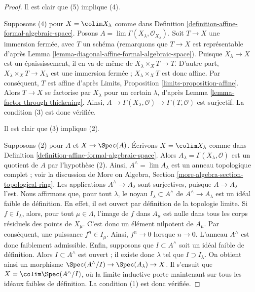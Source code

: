 \begin{proof}
Il est clair que (5) implique (4).

\medskip\noindent
Supposons (4) pour $X = \colim X_\lambda$ comme dans
Definition \ref{definition-affine-formal-algebraic-space}.
Posons $A = \lim \Gamma(X_\lambda, \mathcal{O}_{X_\lambda})$.
Soit $T \to X$ une immersion fermée, avec $T$ un schéma
(remarquons que $T \to X$ est représentable d'après
Lemma \ref{lemma-diagonal-affine-formal-algebraic-space}).
Puisque $X_\lambda \to X$ est un épaississement, il en va de même de
$X_\lambda \times_X T \to T$. D'autre part,
$X_\lambda \times_X T \to X_\lambda$ est une immersion fermée ;
$X_\lambda \times_X T$ est donc affine. Par conséquent, $T$ est affine
d'après Limits, Proposition \ref{limits-proposition-affine}.
Alors $T \to X$ se factorise par $X_\lambda$ pour un certain $\lambda$,
d'après Lemma \ref{lemma-factor-through-thickening}.
Ainsi, $A \to \Gamma(X_\lambda, \mathcal{O}) \to \Gamma(T, \mathcal{O})$
est surjectif. La condition (3) est donc vérifiée.

\medskip\noindent
Il est clair que (3) implique (2).

\medskip\noindent
Supposons (2) pour $A$ et $X \to \Spec(A)$. Écrivons $X = \colim X_\lambda$
comme dans Definition \ref{definition-affine-formal-algebraic-space}.
Alors $A_\lambda = \Gamma(X_\lambda, \mathcal{O})$ est un quotient
de $A$ par l'hypothèse (2). Ainsi, $A^\wedge = \lim A_\lambda$
est un anneau topologique complet ; voir la discussion de
More on Algebra, Section \ref{more-algebra-section-topological-ring}.
Les applications $A^\wedge \to A_\lambda$ sont surjectives, puisque $A \to A_\lambda$ l'est.
Nous affirmons que, pour tout $\lambda$, le noyau $I_\lambda \subset A^\wedge$ de
$A^\wedge \to A_\lambda$ est un idéal faible de définition.
En effet, il est ouvert par définition de la topologie limite.
Si $f \in I_\lambda$, alors, pour tout $\mu \in \Lambda$,
l'image de $f$ dans $A_\mu$ est nulle dans tous les corps résiduels
des points de $X_\mu$. C'est donc un élément nilpotent
de $A_\mu$. Par conséquent, une puissance $f^n \in I_\mu$. Ainsi, $f^n \to 0$
lorsque $n \to 0$. L'anneau $A^\wedge$ est donc faiblement admissible.
Enfin, supposons que $I \subset A^\wedge$ soit un idéal faible
de définition. Alors $I \subset A^\wedge$ est ouvert ; il existe donc
$\lambda$ tel que $I \supset I_\lambda$. On obtient ainsi un morphisme
$\Spec(A^\wedge/I) \to \Spec(A_\lambda) \to X$.
Il s'ensuit que $X = \colim \Spec(A^\wedge/I)$, où
la limite inductive porte maintenant sur tous les idéaux faibles de définition.
La condition (1) est donc vérifiée.


\end{proof}
